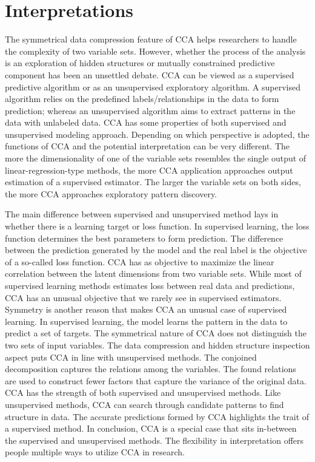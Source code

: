 \section{Interpretations}
\label{ch:methods:interpretations}
The symmetrical data compression feature of CCA helps researchers to handle the complexity of two variable sets. However, whether the process of the analysis is an exploration of hidden structures or mutually constrained predictive component has been an unsettled debate. CCA can be viewed as a supervised predictive algorithm or as an unsupervised exploratory algorithm. A supervised algorithm relies on the predefined labels/relationships in the data to form prediction; whereas an unsupervised algorithm aims to extract patterns in the data with unlabeled data. CCA has some properties of both supervised and unsupervised modeling approach. Depending on which perspective is adopted, the functions of CCA and the potential interpretation can be very different.  The more the dimensionality of one of the variable sets resembles the single output of linear-regression-type methods, the more CCA application approaches output estimation of a supervised estimator. The larger the variable sets on both sides, the more CCA approaches exploratory pattern discovery.

The main difference between supervised and unsupervised method lays in whether there is a learning target or loss function. In supervised learning, the loss function determines the best parameters to form prediction. The difference between the prediction generated by the model and the real label is the objective of a so-called loss function. CCA has as objective to maximize the linear correlation between the latent dimensions from two variable sets. While most of supervised learning methods estimates loss between real data and predictions, CCA has an unusual objective that we rarely see in supervised estimators.  Symmetry is another reason that makes CCA an unusual case of supervised learning. In supervised learning, the model learns the pattern in the data to predict a set of targets. The symmetrical nature of CCA does not distinguish the two sets of input variables. The data compression and hidden structure inspection aspect puts CCA in line with unsupervised methods. The conjoined decomposition captures the relations among the variables. The found relations are used to construct fewer factors that capture the variance of the original data. CCA has the strength of both supervised and unsupervised methods. Like unsupervised methods, CCA can search through candidate patterns to find structure in data. The accurate predictions formed by CCA highlights the trait of a supervised method. In conclusion, CCA is a special case that sits in-between the supervised and unsupervised methods. The flexibility in interpretation offers people multiple ways to utilize CCA in research.

